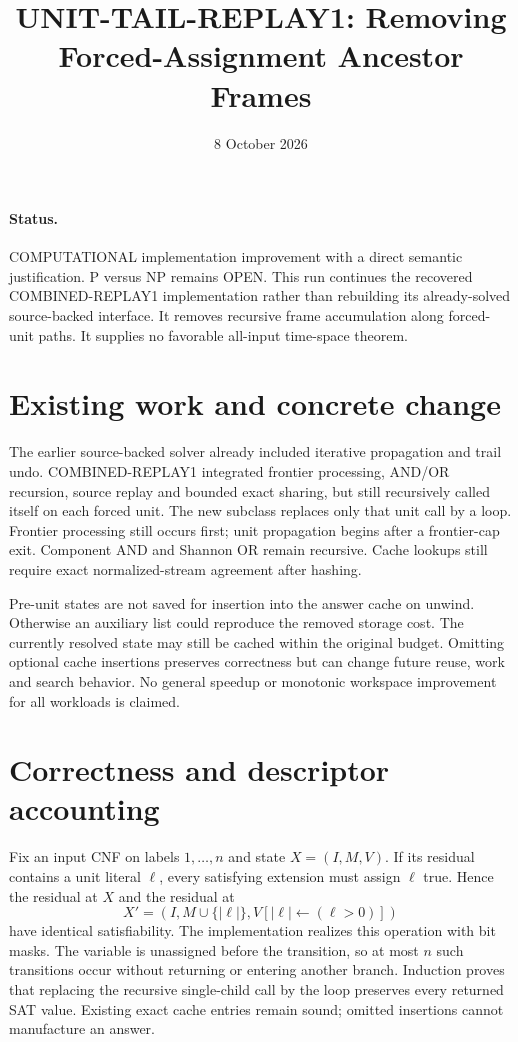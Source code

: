 \documentclass[11pt]{article}
\title{UNIT-TAIL-REPLAY1: Removing Forced-Assignment Ancestor Frames}
\date{8 October 2026}
\begin{document}
\sloppy\maketitle
\paragraph{Status.}
COMPUTATIONAL implementation improvement with a direct semantic justification.
P versus NP remains OPEN. This run continues the recovered COMBINED-REPLAY1
implementation rather than rebuilding its already-solved source-backed interface.
It removes recursive frame accumulation along forced-unit paths.
It supplies no favorable all-input time-space theorem.

\section{Existing work and concrete change}
The earlier source-backed solver already included iterative propagation and
trail undo. COMBINED-REPLAY1 integrated frontier processing, AND/OR recursion,
source replay and bounded exact sharing, but still recursively called itself
on each forced unit. The new subclass replaces only that unit call by a loop.
Frontier processing still occurs first; unit propagation begins after a
frontier-cap exit. Component AND and Shannon OR remain recursive. Cache
lookups still require exact normalized-stream agreement after hashing.

Pre-unit states are not saved for insertion into the answer cache on unwind.
Otherwise an auxiliary list could reproduce the removed storage cost.
The currently resolved state may still be cached within the original budget.
Omitting optional cache insertions preserves correctness but can change
future reuse, work and search behavior. No general speedup or monotonic
workspace improvement for all workloads is claimed.

\section{Correctness and descriptor accounting}
Fix an input CNF on labels $1,\ldots,n$ and state $X=(I,M,V)$.
If its residual contains a unit literal $\ell$, every satisfying extension
must assign $\ell$ true. Hence the residual at $X$ and the residual at
\[
 X'=(I,M\cup\{|\ell|\},V[|\ell|\leftarrow(\ell>0)])
\]
have identical satisfiability. The implementation realizes this operation
with bit masks. The variable is unassigned before the transition, so at
most $n$ such transitions occur without returning or entering another
branch. Induction proves that replacing the recursive single-child call
by the loop preserves every returned SAT value. Existing exact cache
entries remain sound; omitted insertions cannot manufacture an answer.
\end{document}
